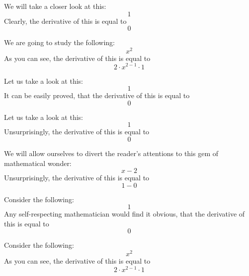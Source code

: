 \documentclass{article}
\begin{document}
We will take a closer look at this:
\begin{equation}
1 
\end{equation}
Clearly, the derivative of this is equal to
\begin{equation}
0 
\end{equation}

We are going to study the following:
\begin{equation}
x ^{2 } 
\end{equation}
As you can see, the derivative of this is equal to
\begin{equation}
2 \cdot x ^{2 - 1 } \cdot 1 
\end{equation}

Let us take a look at this:
\begin{equation}
1 
\end{equation}
It can be easily proved, that the derivative of this is equal to
\begin{equation}
0 
\end{equation}

Let us take a look at this:
\begin{equation}
1 
\end{equation}
Unsurprisingly, the derivative of this is equal to
\begin{equation}
0 
\end{equation}

We will allow ourselves to divert the reader's attentions to this gem of mathematical wonder:
\begin{equation}
x - 2 
\end{equation}
Unsurprisingly, the derivative of this is equal to
\begin{equation}
1 - 0 
\end{equation}

Consider the following:
\begin{equation}
1 
\end{equation}
Any self-respecting mathematician would find it obvious, that the derivative of this is equal to
\begin{equation}
0 
\end{equation}

Consider the following:
\begin{equation}
x ^{2 } 
\end{equation}
As you can see, the derivative of this is equal to
\begin{equation}
2 \cdot x ^{2 - 1 } \cdot 1 
\end{equation}
\end{document}
